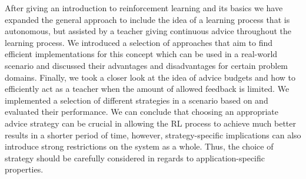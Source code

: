 \documentclass[12pt,twoside]{article}
\theoremstyle{plain}
\theoremstyle{definition}
\theoremstyle{remark}
\begin{document}
After giving an introduction to reinforcement learning and its basics we have expanded the general approach to include the idea of a learning process that is autonomous, but assisted by a teacher giving continuous advice throughout the learning process. We introduced a selection of approaches that aim to find efficient implementations for this concept which can be used in a real-world scenario and discussed their advantages and disadvantages for certain problem domains. Finally, we took a closer look at the idea of advice budgets and how to efficiently act as a teacher when the amount of allowed feedback is limited. We implemented a selection of different strategies in a scenario based on \cite{cruz2014improving} and evaluated their performance. We can conclude that choosing an appropriate advice strategy can be crucial in allowing the RL process to achieve much better results in a shorter period of time, however, strategy-specific implications can also introduce strong restrictions on the system as a whole. Thus, the choice of strategy should be carefully considered in regards to application-specific properties.


\label{sec:concl}

%
%
\newpage


\end{document}
